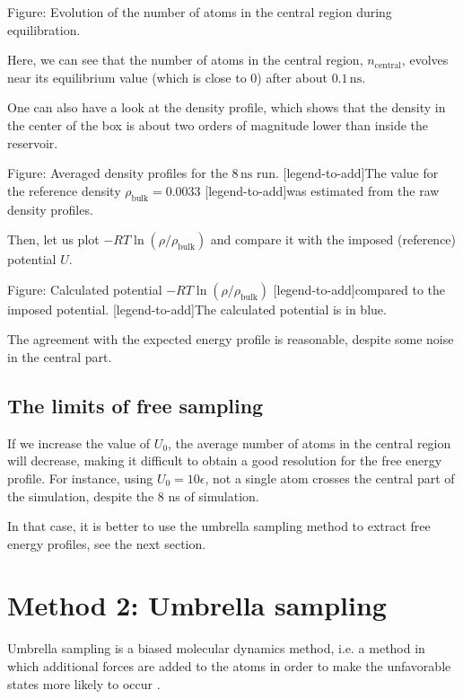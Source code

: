 \vspace{0.25cm} Figure: Evolution of the number of atoms in the central region during equilibration. 

\vspace{0.25cm} \noindent Here, we can see that the number of atoms in the
central region, $n_\mathrm{central}$, evolves near its
equilibrium value (which is close to 0) after about $0.1\,\text{ns}$.

\vspace{0.25cm} \noindent One can also have a look at the density profile, which shows that the density in the
center of the box is about two orders of magnitude lower than inside
the reservoir.

\vspace{0.25cm} Figure: Averaged density profiles for the $8\,\text{ns}$ run. 
[legend-to-add]The value for the reference density $\rho_\text{bulk} = 0.0033$
[legend-to-add]was estimated from the raw density profiles.

\vspace{0.25cm} \noindent Then, let us plot $-R T \ln(\rho/\rho_\mathrm{bulk})$ and compare it
with the imposed (reference) potential $U$.

\vspace{0.25cm} Figure: Calculated potential $-R T \ln(\rho/\rho_\mathrm{bulk})$
[legend-to-add]compared to the imposed potential.
[legend-to-add]The calculated potential is in blue.

\vspace{0.25cm} \noindent The agreement with the expected energy profile is reasonable,
despite some noise in the central part. 

\subsection{The limits of free sampling}
\noindent If we increase the value of $U_0$, the average number of
atoms in the central region will decrease, making it
difficult to obtain a good resolution for the free energy
profile. For instance, using $U_0 = 10 \epsilon$,
not a single atom crosses the central part of the simulation,
despite the 8 ns of simulation.

\vspace{0.25cm} \noindent In that case, it is better to use the umbrella sampling method
to extract free energy profiles, see the next section.

\section{Method 2: Umbrella sampling}
\noindent Umbrella sampling is a biased molecular dynamics method,
i.e. a method in which additional forces are added to the
atoms in order to make the unfavorable states more likely
to occur \cite{frenkel2023understanding}.

